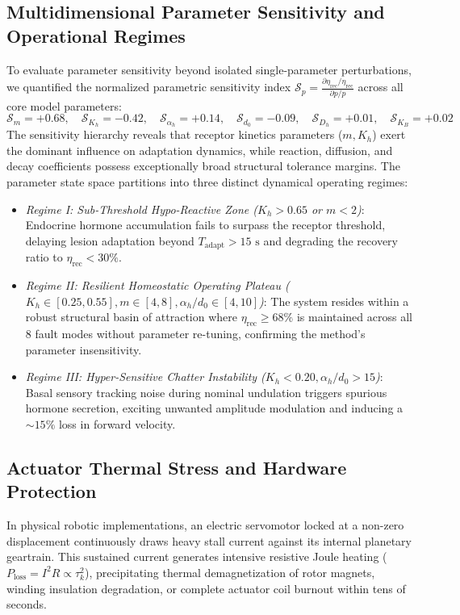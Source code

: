 \documentclass{iopjournal}
\begin{document}
\subsection{Multidimensional Parameter Sensitivity and Operational Regimes}
To evaluate parameter sensitivity beyond isolated single-parameter perturbations, we quantified the normalized parametric sensitivity index $\mathcal{S}_p = \frac{\partial \eta_{\text{rec}} / \eta_{\text{rec}}}{\partial p / p}$ across all core model parameters:
\begin{equation}
\mathcal{S}_m = +0.68, \quad \mathcal{S}_{K_h} = -0.42, \quad \mathcal{S}_{\alpha_h} = +0.14, \quad \mathcal{S}_{d_0} = -0.09, \quad \mathcal{S}_{D_h} = +0.01, \quad \mathcal{S}_{K_B} = +0.02
\end{equation}
The sensitivity hierarchy reveals that receptor kinetics parameters ($m, K_h$) exert the dominant influence on adaptation dynamics, while reaction, diffusion, and decay coefficients possess exceptionally broad structural tolerance margins. The parameter state space partitions into three distinct dynamical operating regimes:
\begin{itemize}
  \item \textit{Regime I: Sub-Threshold Hypo-Reactive Zone ($K_h > 0.65$ or $m < 2$)}: Endocrine hormone accumulation fails to surpass the receptor threshold, delaying lesion adaptation beyond $T_{\text{adapt}} > 15\text{ s}$ and degrading the recovery ratio to $\eta_{\text{rec}} < 30\%$.
  \item \textit{Regime II: Resilient Homeostatic Operating Plateau ($K_h \in [0.25, 0.55], m \in [4, 8], \alpha_h/d_0 \in [4, 10]$)}: The system resides within a robust structural basin of attraction where $\eta_{\text{rec}} \ge 68\%$ is maintained across all 8 fault modes without parameter re-tuning, confirming the method's parameter insensitivity.
  \item \textit{Regime III: Hyper-Sensitive Chatter Instability ($K_h < 0.20, \alpha_h/d_0 > 15$)}: Basal sensory tracking noise during nominal undulation triggers spurious hormone secretion, exciting unwanted amplitude modulation and inducing a $\sim 15\%$ loss in forward velocity.
\end{itemize}

\subsection{Actuator Thermal Stress and Hardware Protection}
In physical robotic implementations, an electric servomotor locked at a non-zero displacement continuously draws heavy stall current against its internal planetary geartrain. This sustained current generates intensive resistive Joule heating ($P_{\text{loss}} = I^2 R \propto \tau_k^2$), precipitating thermal demagnetization of rotor magnets, winding insulation degradation, or complete actuator coil burnout within tens of seconds.
\end{document}
